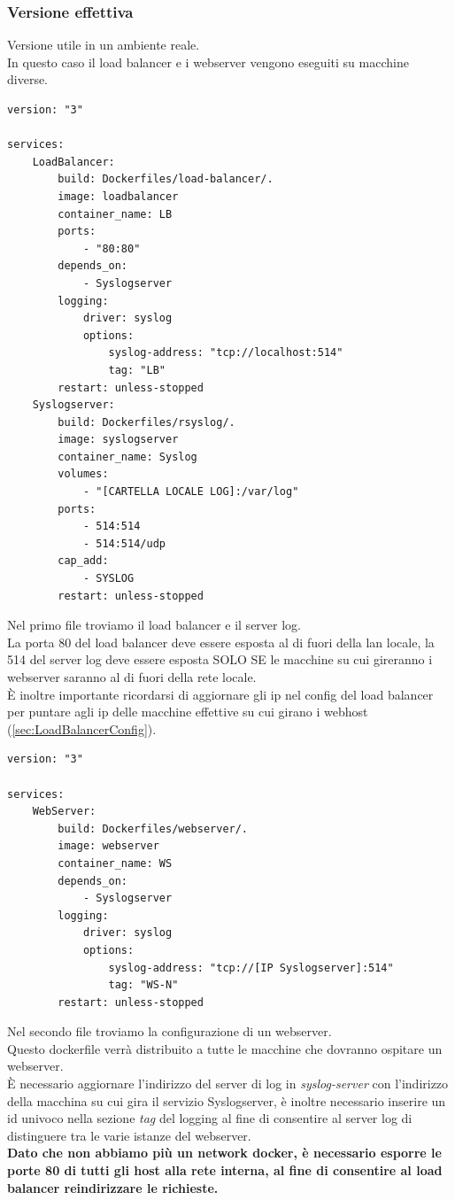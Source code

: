 \documentclass[../DocumentazioneProgetto.tex]{subfiles}
\begin{document}
	\subsubsection{Versione effettiva} 
	Versione utile in un ambiente reale.\\
	In questo caso il load balancer e i webserver vengono eseguiti su macchine diverse.
	\begin{lstlisting}[language=XML, caption=Docker Compose Reale Load Balancer] 
version: "3"

services:
	LoadBalancer:
		build: Dockerfiles/load-balancer/.
		image: loadbalancer
		container_name: LB
		ports:
			- "80:80"
		depends_on:
			- Syslogserver
		logging:
			driver: syslog
			options:
				syslog-address: "tcp://localhost:514"
				tag: "LB"
		restart: unless-stopped
	Syslogserver:
		build: Dockerfiles/rsyslog/.
		image: syslogserver
		container_name: Syslog
		volumes:
			- "[CARTELLA LOCALE LOG]:/var/log"
		ports:
			- 514:514
			- 514:514/udp
		cap_add:
			- SYSLOG
		restart: unless-stopped\end{lstlisting}
		Nel primo file troviamo il load balancer e il server log.\\
		La porta 80 del load balancer deve essere esposta al di fuori della lan locale, la 514 del server log deve essere esposta SOLO SE le macchine su cui gireranno i webserver saranno al di fuori della rete locale.\\
		È inoltre importante ricordarsi di aggiornare gli ip nel config del load balancer per puntare agli ip delle macchine effettive su cui girano i webhost (\autoref{sec:LoadBalancerConfig}).

\begin{lstlisting}[language=XML, caption=Docker Compose Reale Load Balancer] 
version: "3"

services:
	WebServer:
		build: Dockerfiles/webserver/.
		image: webserver
		container_name: WS
		depends_on:
			- Syslogserver
		logging:
			driver: syslog
			options:
				syslog-address: "tcp://[IP Syslogserver]:514"
				tag: "WS-N"
		restart: unless-stopped\end{lstlisting}
	Nel secondo file troviamo la configurazione di un webserver.\\
	Questo dockerfile verrà distribuito a tutte le macchine che dovranno ospitare un webserver.\\
	È necessario aggiornare l'indirizzo del server di log in \textit{syslog-server} con l'indirizzo della macchina su cui gira il servizio Syslogserver, è inoltre necessario inserire un id univoco nella sezione \textit{tag} del logging al fine di consentire al server log di distinguere tra le varie istanze del webserver.\\
	\textbf{Dato che non abbiamo più un network docker, è necessario esporre le porte 80 di tutti gli host alla rete interna, al fine di consentire al load balancer reindirizzare le richieste.} 
\end{document}
